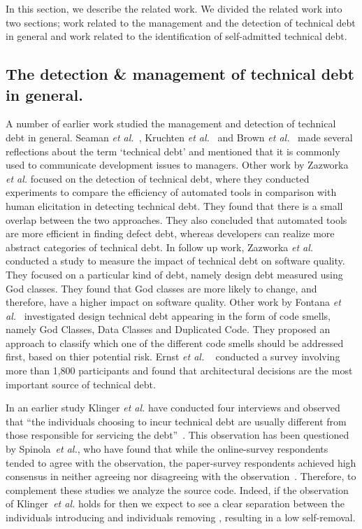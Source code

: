 In this section, we describe the related work. We divided the related work into two sections; work related to the management and the detection of technical debt in general and work related to the identification of self-admitted technical debt.

\subsection{The detection \& management of technical debt in general.} A number of earlier work studied the management and detection of technical debt in general. Seaman \textit{et al.}~\cite{Seaman2011}, Kruchten \textit{et al.}~\cite{Kruchten2013IWMTD} and Brown \textit{et al.}~\cite{Brown2010MTD} made several reflections about the term `technical debt' and mentioned that it is commonly used to communicate development issues to managers. Other work by Zazworka \textit{et al.} \cite{Zazworka2013EASE} focused on the detection of technical debt, where they conducted experiments to compare the efficiency of automated tools in comparison with human elicitation in detecting technical debt. They found that there is a small overlap between the two approaches. They also concluded that automated tools are more efficient in finding defect debt, whereas developers can realize more abstract categories of technical debt. In follow up work, Zazworka \textit{et al.}~\cite{Zazworka2011MTD} conducted a study to measure the impact of technical debt on software quality. They focused on a particular kind of debt, namely design debt measured using God classes. They found that God classes are more likely to change, and therefore, have a higher impact on software quality. Other work by Fontana \textit{et al.}~\cite{Fontana2012MTD} investigated design technical debt appearing in the form of code smells, namely God Classes, Data Classes and Duplicated Code. They proposed an approach to classify which one of the different code smells should be addressed first, based on thier potential risk. Ernst \textit{et al.} ~\cite{Ernst2015FSE} conducted a survey involving more than 1,800 participants and found that architectural decisions are the most important source of technical debt.



In an earlier study Klinger \textit{et al.} have conducted four interviews and observed that ``the individuals choosing to incur technical debt are usually different from those responsible for servicing the debt''~\cite{Klinger:etal}. 
This observation has been questioned by Spinola~\textit{et al.}, who have found that while the online-survey respondents tended to agree with the observation, the paper-survey respondents achieved high consensus in neither agreeing nor disagreeing with the observation~\cite{Spinola:etal}. Therefore, to complement these studies we analyze the source code.
Indeed, if the observation of Klinger~\textit{et al.} holds for \SATD then we expect to see a clear separation between the individuals introducing \SATD and individuals removing \SATD, resulting in a low \SATD self-removal.

